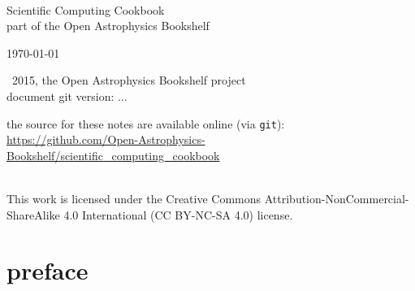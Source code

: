\documentclass[11pt]{book}
\newcommand{\git}{{\tt git}}
\renewcommand{\chaptermark}[1]{%
\markboth{\chaptername
\ \thechapter.\ #1}{}}
\renewcommand{\sectionmark}[1]{\markright{\thesection---#1}}
\begin{document}
\frontmatter

\begin{titlepage}

\ \\[2.5in]
\begin{center}
\begin{mybox}[]
\vskip 3mm
{\Huge Scientific Computing Cookbook} \\[-0.5em]
{\Large part of the Open Astrophysics Bookshelf}
\end{mybox}
\end{center}

\vfill

\begin{flushright}
\today
\end{flushright}

\end{titlepage}

\pagestyle{plain}

\null \vfill 

\noindent \ccCopy\ 2015, the Open Astrophysics Bookshelf project \\
\noindent document git version:  $\ldots$

\noindent the source for these notes are available online (via \git): 
\url{https://github.com/Open-Astrophysics-Bookshelf/scientific_computing_cookbook}

\noindent \ccbyncsa \\
\noindent This work is licensed under the Creative Commons
Attribution-NonCommercial-ShareAlike 4.0 International (CC BY-NC-SA
4.0) license.


\clearpage



\clearpage


\setcounter{tocdepth}{2}
\tableofcontents


\clearpage

\chapter*{preface}
\chaptermark{preface}



\clearpage

\pagestyle{headings}

\renewcommand{\chaptermark}[1]{%
\markboth{\chaptername
\ \thechapter.\ #1}{}}

\renewcommand{\sectionmark}[1]{\markright{\thesection---#1}}
\end{document}

